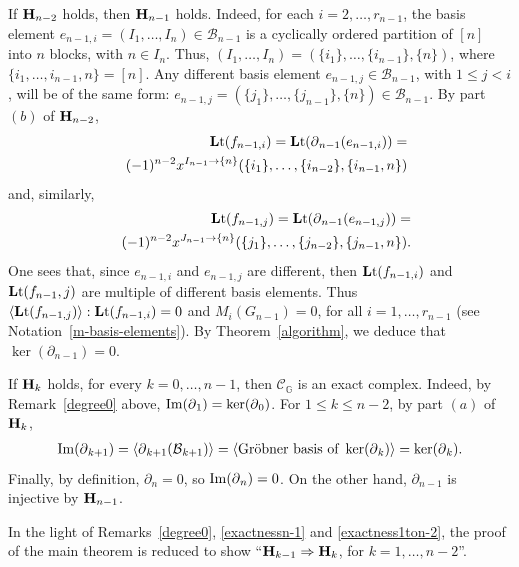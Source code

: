 \documentclass[ALCO]{cedram}
\newcommand{\lt}{\mbox{${\bf L}{\rm t}$}}
\newcommand{\mcb}{\mbox{$\mathcal{B}$}}
\newcommand{\mcc}{\mbox{$\mathcal{C}$}}
\newcommand{\mbfh}{\mbox{${\bf H}$}}
\newcommand{\dif}{\mbox{$\partial$}}
\begin{document}
\begin{remark}\label{exactnessn-1}
If $\mbfh_{n-2}$ holds, then $\mbfh_{n-1}$ holds. Indeed, for each
$i=2,\ldots ,r_{n-1}$, the basis element $e_{n-1,i}=(I_1,\ldots
,I_n)\in\mcb_{n-1}$ is a cyclically ordered partition of $[n]$ into
$n$ blocks, with $n\in I_n$. Thus, $(I_1,\ldots ,I_{n})
=(\{i_1\},\ldots ,\{i_{n-1}\},\{n\})$, where $\{i_1,\ldots
,i_{n-1},n\}=[n]$. Any different basis element
$e_{n-1,j}\in\mcb_{n-1}$, with $1\leq j<i$, will be of the same form:
$e_{n-1,j}=(\{j_1\},\ldots ,\{j_{n-1}\},\{n\})\in\mcb_{n-1}$. By part
$(b)$ of $\mbfh_{n-2}$,
\begin{eqnarray*}
&&\lt(f_{n-1,i})= \lt(\dif_{n-1}(e_{n-1,i}))=\\&&
  (-1)^{n-2}x^{I_{n-1}\to\{n\}}(\{i_1\},\ldots
  ,\{i_{n-2}\},\{i_{n-1},n\})
\end{eqnarray*}
and, similarly,
\begin{eqnarray*}
&&\lt(f_{n-1,j})=\lt(\dif_{n-1}(e_{n-1,j}))=\\&&
(-1)^{n-2}x^{J_{n-1}\to\{n\}}(\{j_1\},\ldots
,\{j_{n-2}\},\{j_{n-1},n\}).
\end{eqnarray*}
One sees that, since $e_{n-1,i}$ and $e_{n-1,j}$ are different, then
$\lt(f_{n-1,i})$ and $\lt(f_{n-1},j)$ are multiple of different basis
elements. Thus
$\langle\lt(f_{n-1,j})\rangle:\lt(f_{n-1,i})=0$ and
$M_i(G_{n-1})=0$, for all $i=1,\ldots ,r_{n-1}$ (see
Notation~\ref{m-basis-elements}). By Theorem~\ref{algorithm}, we
deduce that $\ker(\dif_{n-1})=0$.
\end{remark}

\begin{remark}\label{exactness1ton-2}
If $\mbfh_k$ holds, for every $k=0,\ldots ,n-1$, then
$\mcc_{\mathbb{G}}$ is an exact complex. Indeed, by
Remark~\ref{degree0} above, ${\rm Im}(\dif_1)=\ker(\dif_0)$. For
$1\leq k\leq n-2$, by part $(a)$ of $\mbfh_k$,
\begin{eqnarray*}
{\rm Im}(\dif_{k+1})=\langle
\dif_{k+1}(\mcb_{k+1})\rangle=\langle \mbox{Gr\"obner basis of
}\ker(\dif_k)\rangle =\ker(\dif_{k}).
\end{eqnarray*}
Finally, by definition, $\dif_{n}=0$, so ${\rm Im}(\dif_{n})=0$. On
the other hand, $\dif_{n-1}$ is injective by $\mbfh_{n-1}$.
\end{remark}

\begin{purpose}\label{reduction}
In the light of Remarks~\ref{degree0}, \ref{exactnessn-1} and
\ref{exactness1ton-2}, the proof of the main theorem is reduced to
show ``$\mbfh_{k-1}\Rightarrow \mbfh_{k}$, for $k=1,\ldots ,n-2$''.
\end{purpose}
\end{document}
